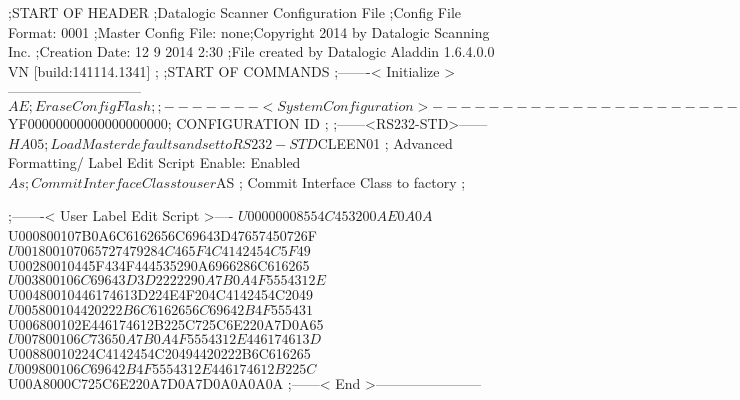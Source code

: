 ;START OF HEADER
;Datalogic Scanner Configuration File
;Config File Format: 0001
;Master Config File: none;Copyright 2014 by Datalogic Scanning Inc.
;Creation Date: 12 9 2014 2:30
;File created by Datalogic Aladdin 1.6.4.0.0 VN [build:141114.1341]
;
;START OF COMMANDS
;-------< Initialize >-----------------------------
$AE                 ; Erase Config Flash
;
;-------< System Configuration >-------------------------------
$YF00000000000000000000; CONFIGURATION ID
;
;------<RS232-STD>------
$HA05              ; Load Master defaults and set to RS232-STD
$CLEEN01            ; Advanced Formatting/ Label Edit Script Enable: Enabled
$As                 ; Commit Interface Class to user
$AS                 ; Commit Interface Class to factory
;

;-------< User Label Edit Script >----
$U00000008554C453200AE0A0A
$U000800107B0A6C6162656C69643D47657450726F
$U001800107065727479284C465F4C4142454C5F49
$U00280010445F434F444535290A6966286C616265
$U003800106C69643D3D2222290A7B0A4F5554312E
$U00480010446174613D224E4F204C4142454C2049
$U005800104420222B6C6162656C69642B4F555431
$U006800102E446174612B225C725C6E220A7D0A65
$U007800106C73650A7B0A4F5554312E446174613D
$U00880010224C4142454C20494420222B6C616265
$U009800106C69642B4F5554312E446174612B225C
$U00A8000C725C6E220A7D0A7D0A0A0A0A
;------< End >-----------------------
